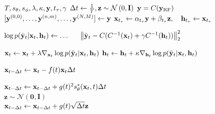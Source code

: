 \begin{algorithm}[tb]
    \caption{Dehazing by joint posterior diffusion sampling}
    \label{alg:joint_cond_sampler}
\begin{algorithmic}[1]
    \REQUIRE $T, s_\theta, s_\phi, \lambda, \kappa, {\mathbf y}, t_\tau, \gamma$
    \SET $\Delta t \gets \frac{1}{T}, {\mathbf z} \sim \mathcal{N}\left(0, {\mathbf I}\right)$
    \SET ${\mathbf y} = C({\mathbf y}_\text{RF})$ 
    \SET $[ {\mathbf y}^{(0, 0)}, \ldots, {\mathbf y}^{(n, m)}, \dots, {\mathbf y}^{(N, M)} ] \gets {\mathbf y}$ 
    \SET ${\mathbf x}_{t_\tau} \gets \alpha_{t_\tau}{\mathbf y} + \beta_{t_\tau} {\mathbf z}, \quad {\mathbf h}_{t_\tau} \gets {\mathbf x}_{t_\tau}$
    \\
    
        \STATE {}
        
        
        
            \STATE {}
            \STATE $\log{p(\hat{\by}_t|\bx_t, \bh_t)} \gets \ldots \newline
            \hspace*{5mm} \norm{\hat{\by}_t - C(C^{-1}(\bx_t) + \gamma C^{-1}(\bh_t))}_2^2$
            
            \STATE {}
            \STATE ${\mathbf x}_t \gets {\mathbf x}_t + \lambda \nabla_{{\mathbf x}_t} \log{p(\hat{{\mathbf y}}_t|{\mathbf x}_t, {\mathbf h}_t)}$
            \STATE ${\mathbf h}_t \gets {\mathbf h}_t + \kappa \nabla_{{\mathbf h}_t} \log{p(\hat{{\mathbf y}}_t|{\mathbf x}_t, {\mathbf h}_t)}$
            
            \STATE {}
            
            \STATE ${\mathbf x}_{t-\Delta t} \gets {\mathbf x}_{t} - f(t){\mathbf x}_{t} \Delta t$ 
            
            \STATE ${\mathbf x}_{t-\Delta t} \gets {\mathbf x}_{t-\Delta t} + g(t)^2 s_\theta^*({\mathbf x}_{t}, t) \Delta t$\\
            \STATE $\mathbf{z} \sim \mathcal{N}(\mathbf{0}, \mathbf{I})$\\
            \STATE ${\mathbf x}_{t-\Delta t} \gets {\mathbf x}_{t-\Delta t} + g(t) \sqrt{\Delta t} \mathbf{z}$
            

\end{algorithmic}
\end{algorithm}
